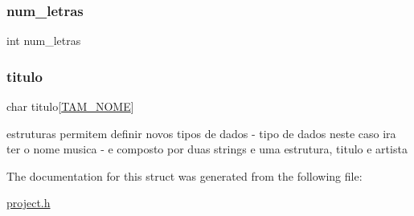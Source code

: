 \mbox{\label{structmusica_a65092ca80b96aad412ee3f06c9b506e3}} 
\subsubsection{\texorpdfstring{num\_letras}{num\_letras}}
{\footnotesize\ttfamily int num\+\_\+letras}

\mbox{\label{structmusica_a6dba2e20e00fd8307192a7e0dce4b3d9}} 
\subsubsection{\texorpdfstring{titulo}{titulo}}
{\footnotesize\ttfamily char titulo\mbox{[}\mbox{\hyperlink{project_8h_ad0e480e07eae04b077948c75deb75422}{T\+A\+M\+\_\+\+N\+O\+ME}}\mbox{]}}



estruturas permitem definir novos tipos de dados -\/ tipo de dados neste caso ira ter o nome musica -\/ e composto por duas strings e uma estrutura, titulo e artista 



The documentation for this struct was generated from the following file\+:\begin{DoxyCompactItemize}
\item 
\mbox{\hyperlink{project_8h}{project.\+h}}\end{DoxyCompactItemize}
